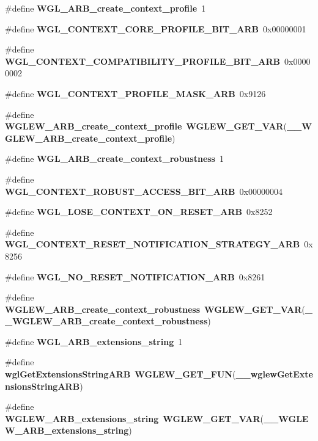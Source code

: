 \begin{DoxyCompactItemize}
\item 
\#define {\bf W\+G\+L\+\_\+\+A\+R\+B\+\_\+create\+\_\+context\+\_\+profile}~1
\item 
\#define {\bf W\+G\+L\+\_\+\+C\+O\+N\+T\+E\+X\+T\+\_\+\+C\+O\+R\+E\+\_\+\+P\+R\+O\+F\+I\+L\+E\+\_\+\+B\+I\+T\+\_\+\+A\+RB}~0x00000001
\item 
\#define {\bf W\+G\+L\+\_\+\+C\+O\+N\+T\+E\+X\+T\+\_\+\+C\+O\+M\+P\+A\+T\+I\+B\+I\+L\+I\+T\+Y\+\_\+\+P\+R\+O\+F\+I\+L\+E\+\_\+\+B\+I\+T\+\_\+\+A\+RB}~0x00000002
\item 
\#define {\bf W\+G\+L\+\_\+\+C\+O\+N\+T\+E\+X\+T\+\_\+\+P\+R\+O\+F\+I\+L\+E\+\_\+\+M\+A\+S\+K\+\_\+\+A\+RB}~0x9126
\item 
\#define {\bf W\+G\+L\+E\+W\+\_\+\+A\+R\+B\+\_\+create\+\_\+context\+\_\+profile}~{\bf W\+G\+L\+E\+W\+\_\+\+G\+E\+T\+\_\+\+V\+AR}({\bf \+\_\+\+\_\+\+W\+G\+L\+E\+W\+\_\+\+A\+R\+B\+\_\+create\+\_\+context\+\_\+profile})
\item 
\#define {\bf W\+G\+L\+\_\+\+A\+R\+B\+\_\+create\+\_\+context\+\_\+robustness}~1
\item 
\#define {\bf W\+G\+L\+\_\+\+C\+O\+N\+T\+E\+X\+T\+\_\+\+R\+O\+B\+U\+S\+T\+\_\+\+A\+C\+C\+E\+S\+S\+\_\+\+B\+I\+T\+\_\+\+A\+RB}~0x00000004
\item 
\#define {\bf W\+G\+L\+\_\+\+L\+O\+S\+E\+\_\+\+C\+O\+N\+T\+E\+X\+T\+\_\+\+O\+N\+\_\+\+R\+E\+S\+E\+T\+\_\+\+A\+RB}~0x8252
\item 
\#define {\bf W\+G\+L\+\_\+\+C\+O\+N\+T\+E\+X\+T\+\_\+\+R\+E\+S\+E\+T\+\_\+\+N\+O\+T\+I\+F\+I\+C\+A\+T\+I\+O\+N\+\_\+\+S\+T\+R\+A\+T\+E\+G\+Y\+\_\+\+A\+RB}~0x8256
\item 
\#define {\bf W\+G\+L\+\_\+\+N\+O\+\_\+\+R\+E\+S\+E\+T\+\_\+\+N\+O\+T\+I\+F\+I\+C\+A\+T\+I\+O\+N\+\_\+\+A\+RB}~0x8261
\item 
\#define {\bf W\+G\+L\+E\+W\+\_\+\+A\+R\+B\+\_\+create\+\_\+context\+\_\+robustness}~{\bf W\+G\+L\+E\+W\+\_\+\+G\+E\+T\+\_\+\+V\+AR}({\bf \+\_\+\+\_\+\+W\+G\+L\+E\+W\+\_\+\+A\+R\+B\+\_\+create\+\_\+context\+\_\+robustness})
\item 
\#define {\bf W\+G\+L\+\_\+\+A\+R\+B\+\_\+extensions\+\_\+string}~1
\item 
\#define {\bf wgl\+Get\+Extensions\+String\+A\+RB}~{\bf W\+G\+L\+E\+W\+\_\+\+G\+E\+T\+\_\+\+F\+UN}({\bf \+\_\+\+\_\+wglew\+Get\+Extensions\+String\+A\+RB})
\item 
\#define {\bf W\+G\+L\+E\+W\+\_\+\+A\+R\+B\+\_\+extensions\+\_\+string}~{\bf W\+G\+L\+E\+W\+\_\+\+G\+E\+T\+\_\+\+V\+AR}({\bf \+\_\+\+\_\+\+W\+G\+L\+E\+W\+\_\+\+A\+R\+B\+\_\+extensions\+\_\+string})

\end{DoxyCompactItemize}
